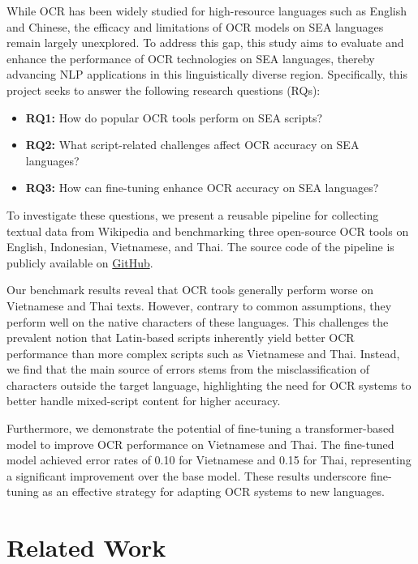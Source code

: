 \documentclass[12pt,oneside]{memoir}
\begin{document}
While OCR has been widely studied for high-resource languages such as English and Chinese, the efficacy and limitations of OCR models on SEA languages remain largely unexplored.
To address this gap, this study aims to evaluate and enhance the performance of OCR technologies on SEA languages, thereby advancing NLP applications in this linguistically diverse region.
Specifically, this project seeks to answer the following research questions (RQs):

\begin{itemize}
    \item \textbf{RQ1:} How do popular OCR tools perform on SEA scripts?
    \item \textbf{RQ2:} What script-related challenges affect OCR accuracy on SEA languages?
    \item \textbf{RQ3:} How can fine-tuning enhance OCR accuracy on SEA languages?
\end{itemize}

To investigate these questions, we present a reusable pipeline for collecting textual data from Wikipedia and benchmarking three open-source OCR tools on English, Indonesian, Vietnamese, and Thai.
The source code of the pipeline is publicly available on \href{https://github.com/jasonqiu212/ocr-benchmarking-on-sea-languages}{GitHub}.

Our benchmark results reveal that OCR tools generally perform worse on Vietnamese and Thai texts.
However, contrary to common assumptions, they perform well on the native characters of these languages. 
This challenges the prevalent notion that Latin-based scripts inherently yield better OCR performance than more complex scripts such as Vietnamese and Thai.
Instead, we find that the main source of errors stems from the misclassification of characters outside the target language, highlighting the need for OCR systems to better handle mixed-script content for higher accuracy.

Furthermore, we demonstrate the potential of fine-tuning a transformer-based model to improve OCR performance on Vietnamese and Thai. 
The fine-tuned model achieved error rates of 0.10 for Vietnamese and 0.15 for Thai, representing a significant improvement over the base model.
These results underscore fine-tuning as an effective strategy for adapting OCR systems to new languages.

\chapter{Related Work}
\end{document}
